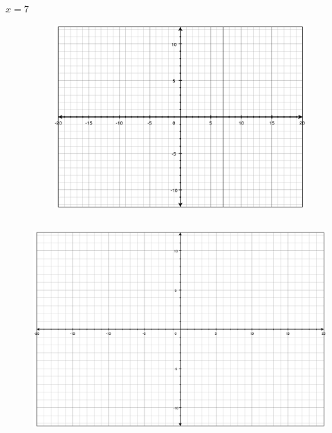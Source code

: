 \documentclass[fleqn,addpoints]{exam}
\begin{document}
\begin{questions}
\question[5] \( x = 7\)
\begin{figure}[H]
\ifprintanswers
  \includegraphics[width=12cm,height=7cm]{problem2}
\else
  \includegraphics[width=15cm,height=9cm]{axes}
\fi
\end{figure}


\end{questions}
\end{document}
